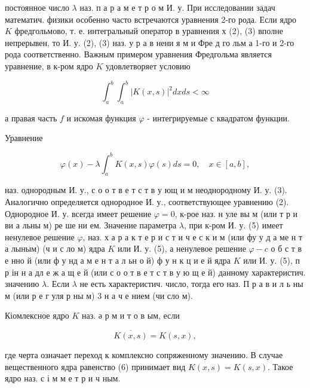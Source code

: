 \documentclass[10pt]{article}
\begin{document}
постоянное число $\lambda$ наз. п а р а м е т р о м И. у. При исследовании задач математич. физики особенно часто встречаются уравнения 2-го рода. Если ядро $K$ фредгольмово, т. е. интегральный оператор в уравнения х (2), (3) вполне непрерывен, то И. у. (2), (3) наз. у р а в нени я м и Фре д го льм а 1-го и 2-го рода соответственно. Важным примером уравнения Фредгольма является уравнение, в к-ром ядро $K$ удовлетворяет условию



\[

\int_{a}^{b} \int_{a}^{b}|K(x, s)|^{2} d x d s<\infty

\]



а правая часть $f$ и искомая функция $\varphi$ - интегрируемые с квадратом функции.



Уравнение



\[

\varphi(x)-\lambda \int_{a}^{b} K(x, s) \varphi(s) d s=0, \quad x \in[a, b],

\]



наз. однородным И. у., с о о т в е т с т в у ющ и м неоднородному И. у. (3). Аналогично определяется однородное И. у., соответствующее уравнению (2). Однородное И. у. всегда имеет решение $\varphi=0$, к-рое наз. н уле вы м (или т р и ви а льны м) ре ше ни ем. Значение параметра $\lambda$, при к-ром И. у. (5) имеет ненулевое решение $\varphi$, наз. х а р а к т е р и с т и ч е с к и м (или фу у д а ме н т а лыным) (ч и с ло м) ядра $K$ или И. у. (5), а ненулевое решение $\varphi-c$ о б с т в е нно й (или ф у нд а м е н т а л ьн о й) ф у н к ц и е й ядра $K$ или И. у. (5), п р ін н а дл е ж а щ е й (или с о о т в е т с т в у ю щ е й) данному характеристич. значению $\lambda$. Если $\lambda$ не есть характеристич. число, тогда его наз. П р а в и л ь ны м (или р е г уля р ны м) 3 н а ч е нием (чи сло м).



Кіомлексное ядро $K$ наз. ә р м и т о в ым, если



\[

\overline{K(x, s)}=K(s, x),

\]



где черта означает переход к комплексно сопряженному значению. В случае вещественного ядра равенство (6) принимает вид $K(x, s)=K(s, x)$. Такое ядро наз. с і м м е т р и ч ным.
\end{document}
